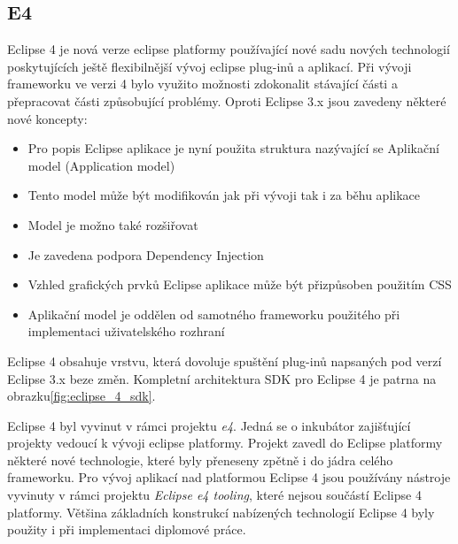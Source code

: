 \documentclass[ing,male,java,dept460]{diploma}		%
\begin{document}
\subsection{E4}
Eclipse 4 je nová verze eclipse platformy používající nové sadu nových technologií poskytujících ještě flexibilnější vývoj eclipse plug-inů a aplikací. Při vývoji frameworku ve verzi 4 bylo využito možnosti zdokonalit stávající části a přepracovat části způsobující problémy. Oproti Eclipse 3.x jsou zavedeny některé nové koncepty:
\begin{itemize}
	\item Pro popis Eclipse aplikace je nyní použita struktura nazývající se Aplikační model (Application model)
	\item Tento model může být modifikován jak při vývoji tak i za běhu aplikace
	\item Model je možno také rozšiřovat
	\item Je zavedena podpora Dependency Injection
	\item Vzhled grafických prvků Eclipse aplikace může být přizpůsoben použitím CSS
	\item Aplikační model je oddělen od samotného frameworku použitého při implementaci uživatelského rozhraní
\end{itemize}
\par Eclipse 4 obsahuje vrstvu, která dovoluje spuštění plug-inů napsaných pod verzí Eclipse 3.x beze změn. Kompletní architektura SDK pro Eclipse 4 je patrna na obrazku\ref{fig:eclipse_4_sdk}.

\par Eclipse 4 byl vyvinut v rámci projektu \textit{e4}. Jedná se o inkubátor zajišťující projekty vedoucí k vývoji eclipse platformy. Projekt zavedl do Eclipse platformy některé nové technologie, které byly přeneseny zpětně i do jádra celého frameworku. Pro vývoj aplikací nad platformou Eclipse 4 jsou používány nástroje vyvinuty v rámci projektu \textit{Eclipse e4 tooling}, které nejsou součástí Eclipse 4 platformy. Většina základních konstrukcí nabízených technologií Eclipse 4 byly použity i při implementaci diplomové práce.
\end{document}
